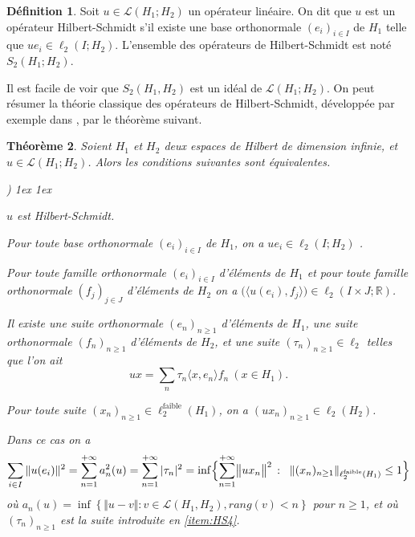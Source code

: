 \documentclass{smfart}
\theoremstyle{plain}
\newtheorem{theorem}{Théorème}[section]
\theoremstyle{definition}
\newtheorem{definition}[theorem]{Définition}
\newcommand\R{{\mathbb R}}
\newcommand {\FAIBLE} {\text{faible}}
\newcommand {\SUCHTHAT} {\,:\;}
\newcommand {\norm}[1] {\| #1 \|}               %
\newcommand {\bignorm}[1]{\bigl\| #1 \bigr\|}
\newcommand {\BOUNDED} {{\mathcal L}}
\newcounter{aufzi}
\newenvironment{aufzi}{\begin{list}{ {\upshape\alph{aufzi})}}{
        \usecounter{aufzi}
        \topsep1ex
        \parsep0cm
        \itemsep1ex
        \leftmargin0.8cm
        \labelwidth0.5cm
        \labelsep0.3cm
}}
{\end{list}}
\begin{document}
\begin{definition}
  Soit $u \in {\mathcal L}(H_1; H_2)$ un opérateur linéaire. On dit que $u$ est un
  opérateur Hilbert-Schmidt s'il existe une base orthonormale
  $(e_i)_{i\in I}$ de $H_1$ telle que $u e_i \in \ell_2(I; H_2)$.
  L'ensemble des opérateurs de Hilbert-Schmidt est noté
  $S_2(H_1; H_2)$.
\end{definition}

\noindent Il est facile de voir que $S_2(H_1,H_2)$ est un idéal de
$\BOUNDED(H_1; H_2)$.  On peut résumer la théorie classique des
opérateurs de Hilbert-Schmidt, développée par exemple dans \cite{DJT},
par le théorème suivant.

\begin{theorem}\label{thm:HS}
  Soient $H_1$ et $H_2$ deux espaces de Hilbert de dimension infinie,
  et $u \in {\mathcal L}(H_1;H_2)$. Alors les
  conditions suivantes sont équivalentes.
\begin{aufzi}
  \item\label{item:HS1} $u$ est Hilbert-Schmidt.
  \item\label{item:HS2} Pour toute base orthonormale $(e_i)_{i\in I}$
    de $H_1$, on a $u e_i \in \ell_2(I; H_2)$ .
  \item\label{item:HS3} Pour toute famille orthonormale $(e_i)_{i \in
      I}$ d'éléments de $H_1$ et pour toute famille orthonormale
    $(f_j)_{j \in J}$ d'éléments de $H_2$ on a $\bigl( \langle
    u(e_i),f_j \rangle\bigr) \in \ell_2(I{\times}J; \R)$.
  \item\label{item:HS4} Il existe une suite orthonormale $(e_n)_{n\ge
      1}$ d'éléments de $H_1$, une suite orthonormale $(f_n)_{n\ge 1}$
    d'éléments de $H_2$, et une suite $(\tau_n)_{n\ge 1}\in \ell_2$
    telles que l'on ait
    \[ %
        ux=\sum _n\tau_n\langle x,e_n \rangle f_n \ (x \in H_1).
    \] %
  \item\label{item:HS5} Pour toute suite $(x_n)_{n\ge 1} \in
    \ell_2^\FAIBLE(H_1)$, on a $(ux_n)_{n\ge 1}  \in \ell_2(H_2)$.
  \end{aufzi}
  Dans ce cas on a
\[
\sum_{i\in I}\Vert u(e_i)\Vert^2= \sum_{n=1}^{+\infty}a_n^2(u)= \sum
_{n=1}^{+\infty}\vert \tau _n \vert^2 = \inf \Bigl\{ \sum_{n=1}^{+\infty}
\bignorm{ u x_n }^2 \SUCHTHAT \; \norm{ (x_n)_{n\ge 1} }_{\ell_2^\FAIBLE(H_1)}
\le 1 \Bigr\}
\]
où $a_n(u)= \inf \left \{ \Vert u - v\Vert : v \in {\mathcal
    L}(H_1,H_2), rang(v) < n \right \}$ pour $n \ge 1$, et où
$(\tau_n)_{n\ge 1}$ est la suite introduite en \ref{item:HS4}.  
\end{theorem}
\end{document}
